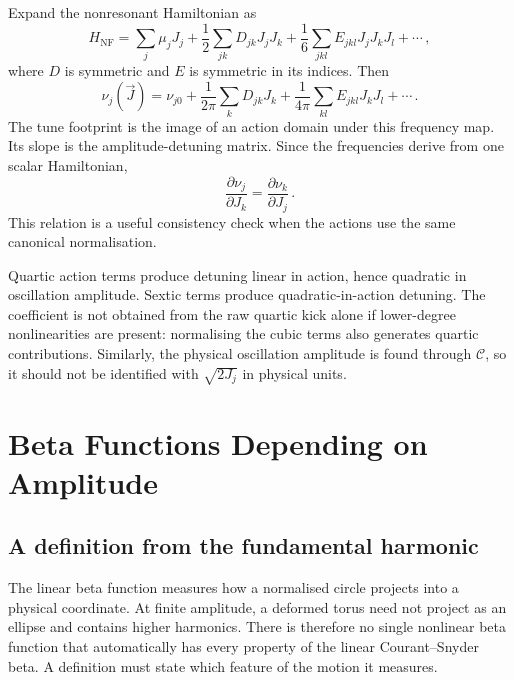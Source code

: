 Expand the nonresonant Hamiltonian as
\begin{equation}\label{eq:nnf-detuning-hamiltonian}
    H_{\mathrm{NF}} = \sum_j\mu_jJ_j + \frac12\sum_{jk}D_{jk}J_jJ_k + \frac16\sum_{jkl}E_{jkl}J_jJ_kJ_l + \cdots\,,
\end{equation}
where $D$ is symmetric and $E$ is symmetric in its indices.  Then
\begin{equation}\label{eq:nnf-detuning-tunes}
    \nu_j(\vec J) = \nu_{j0} + \frac{1}{2\pi}\sum_kD_{jk}J_k + \frac{1}{4\pi}\sum_{kl}E_{jkl}J_kJ_l + \cdots\,.
\end{equation}
The tune footprint is the image of an action domain under this frequency
map.  Its slope is the amplitude-detuning matrix.  Since the frequencies
derive from one scalar Hamiltonian,
\begin{equation}\label{eq:nnf-detuning-symmetry}
    \frac{\partial\nu_j}{\partial J_k} = \frac{\partial\nu_k}{\partial J_j}\,.
\end{equation}
This relation is a useful consistency check when the actions use the same
canonical normalisation.

Quartic action terms produce detuning linear in action, hence quadratic
in oscillation amplitude.  Sextic terms produce quadratic-in-action
detuning.  The coefficient is not obtained from the raw quartic kick
alone if lower-degree nonlinearities are present: normalising the cubic
terms also generates quartic contributions.  Similarly, the physical
oscillation amplitude is found through $\mathcal C$, so it should not be
identified with $\sqrt{2J_j}$ in physical units.



\section{Beta Functions Depending on Amplitude}

\subsection{A definition from the fundamental harmonic}

The linear beta function measures how a normalised circle projects into a
physical coordinate.  At finite amplitude, a deformed torus need not
project as an ellipse and contains higher harmonics.  There is therefore
no single nonlinear beta function that automatically has every property
of the linear Courant--Snyder beta.  A definition must state which feature
of the motion it measures.

